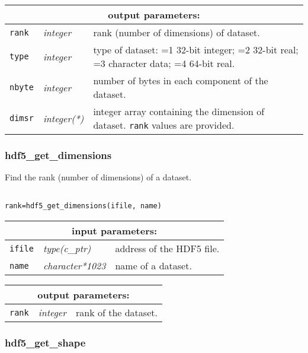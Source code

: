\noindent
\begin{tabular}{|p{1.5cm}|p{3cm}|p{10cm}|}
\hline
\multicolumn{3}{|c|}{\bf output parameters:} \\
\hline
{\tt rank} & {\it integer} & rank (number of dimensions) of dataset. \\
\hline
{\tt type} & {\it integer} & type of dataset: =1 32-bit integer; 
                                    =2 32-bit real; =3 character data; 
				    =4 64-bit real. \\
\hline
{\tt nbyte} & {\it integer} & number of bytes in each component of the dataset. \\
\hline
{\tt dimsr} & {\it integer(*)} & integer array containing the dimension of dataset. {\tt rank} values are provided. \\
\hline
\end{tabular}

\subsubsection{hdf5\_get\_dimensions}

Find the rank (number of dimensions) of a dataset.

\begin{verbatim}

rank=hdf5_get_dimensions(ifile, name)
\end{verbatim}

\noindent
\begin{tabular}{|p{1.5cm}|p{3cm}|p{10cm}|}
\hline
\multicolumn{3}{|c|}{\bf input parameters:} \\
\hline
{\tt ifile} & {\it type(c\_ptr)} & address of the HDF5 file. \\
\hline
{\tt name} & {\it character*1023} & name of a dataset. \\
\hline
\end{tabular}

\vskip 0.8cm

\noindent
\begin{tabular}{|p{1.5cm}|p{3cm}|p{10cm}|}
\hline
\multicolumn{3}{|c|}{\bf output parameters:} \\
\hline
{\tt rank} & {\it integer} & rank of the dataset. \\
\hline
\end{tabular}

\subsubsection{hdf5\_get\_shape}

